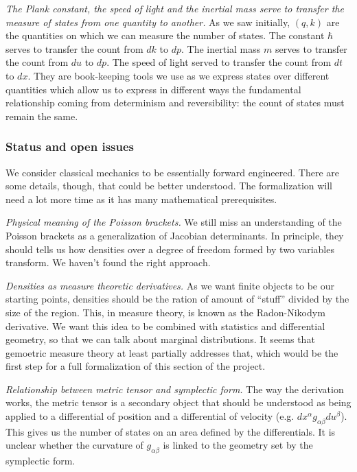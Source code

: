 \documentclass[twocolumn]{article}
\begin{document}
\emph{The Plank constant, the speed of light and the inertial mass serve to transfer the measure of states from one quantity to another.} As we saw initially, $(q, k)$ are the quantities on which we can measure the number of states. The constant $\hbar$ serves to transfer the count from $dk$ to $dp$. The inertial mass $m$ serves to transfer the count from $du$ to $dp$. The speed of light served to transfer the count from $dt$ to $dx$. They are book-keeping tools we use as we express states over different quantities which allow us to express in different ways the fundamental relationship coming from determinism and reversibility: the count of states must remain the same.

\subsubsection{Status and open issues}

We consider classical mechanics to be essentially forward engineered. There are some details, though, that could be better understood. The formalization will need a lot more time as it has many mathematical prerequisites.

\emph{Physical meaning of the Poisson brackets.} We still miss an understanding of the Poisson brackets as a generalization of Jacobian determinants. In principle, they should tells us how densities over a degree of freedom formed by two variables transform. We haven't found the right approach.

\emph{Densities as measure theoretic derivatives.} As we want finite objects to be our starting points, densities should be the ration of amount of ``stuff'' divided by the size of the region. This, in  measure theory, is known as the Radon-Nikodym derivative. We want this idea to be combined with statistics and differential geometry, so that we can talk about marginal distributions. It seems that gemoetric measure theory at least partially addresses that, which would be the first step for a full formalization of this section of the project.

\emph{Relationship between metric tensor and symplectic form.} The way the derivation works, the metric tensor is a secondary object that should be understood as being applied to a differential of position and a differential of velocity (e.g. $dx^\alpha g_{\alpha \beta} du^\beta$). This gives us the number of states on an area defined by the differentials. It is unclear whether the curvature of $g_{\alpha \beta}$ is linked to the geometry set by the symplectic form.
\end{document}
